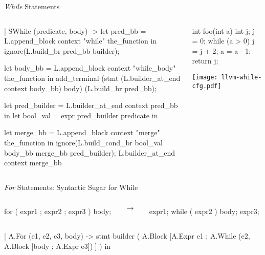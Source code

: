 \documentclass{plt}
\begin{document}
\begin{frame}[fragile=singleslide]{\emph{While} Statements}

\begin{columns}
\begin{column}{0.65\textwidth}
\begin{ocaml}
| SWhile (predicate, body) ->
  let pred_bb = L.append_block context
                     "while" the_function in
  ignore(L.build_br pred_bb builder);

  let body_bb = L.append_block context
                "while_body" the_function in
  add_terminal
    (stmt (L.builder_at_end context body_bb)
          body)
    (L.build_br pred_bb);

  let pred_builder =
         L.builder_at_end context pred_bb in
  let bool_val =
              expr pred_builder predicate in

  let merge_bb = L.append_block context
                     "merge" the_function in
  ignore(L.build_cond_br bool_val
             body_bb merge_bb pred_builder);
  L.builder_at_end context merge_bb
\end{ocaml}
\end{column}
\begin{column}{0.35\textwidth}

\begin{C}
int foo(int a)
{
  int j;
  j = 0;
  while (a > 0) {
    j = j + 2;
    a = a - 1;
  }
  return j;
}
\end{C}

\texttt{[image: llvm-while-cfg.pdf]}

\end{column}
\end{columns}

\end{frame}

\begin{frame}[fragile=singleslide]{\emph{For} Statements: Syntactic Sugar for While}

\begin{columns}
\begin{column}{0.5\textwidth}
\begin{C}
for ( expr1 ; expr2 ; expr3 ) {
  body;
}
\end{C}
\end{column}
\begin{column}{1pc}
$\rightarrow$
\end{column}
\begin{column}{0.4\textwidth}
\begin{C}
expr1;
while ( expr2 ) {
   body;
   expr3;
}
\end{C}
\end{column}
\end{columns}

\begin{ocaml}
      | A.For (e1, e2, e3, body) -> stmt builder
            ( A.Block [A.Expr e1 ;
                       A.While (e2, A.Block [body ;
                                             A.Expr e3]) ] )
    in
\end{ocaml}

\end{frame}
\end{document}
